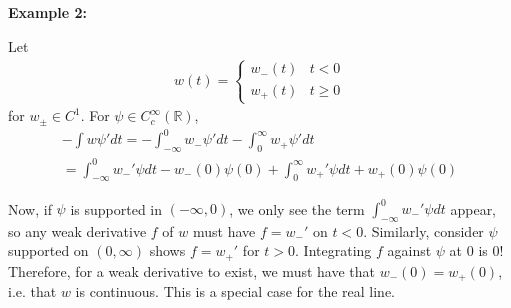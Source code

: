 \documentclass{article}
\newcommand{\R}{{\mathbb{R}}}
\newcommand{\CC}{C_{c}^{\infty}}
\begin{document}
	\textbf{Example 2:}
	
	Let 
	\begin{align*}
		w(t) = \begin{cases}
			w_{-}(t) & t<0 \\ w_{+}(t) & t \geq 0
		\end{cases}
	\end{align*}
	for $w_{\pm} \in C^{1}$. For $\psi \in \CC(\R)$,
	\begin{align*}
		-\int w \psi'dt = - \int_{-\infty}^{0} w_{-}\psi' dt - \int_{0}^{\infty} w_{+} \psi'dt \\
		= \int_{-\infty}^{0} w_{-}'\psi dt - w_{-}(0)\psi(0) + \int_{0}^{\infty} w_{+}' \psi dt + w_{+}(0)\psi(0)
	\end{align*}
	
	Now, if $\psi$ is supported in $(-\infty,0)$, we only see the term $\int_{-\infty}^{0} w_{-}'\psi dt$ appear, so any weak derivative $f$ of $w$ must have $f = w_{-}'$ on $t<0$. Similarly, consider $\psi$ supported on $(0,\infty)$ shows $f = w_{+}'$ for $t>0$. Integrating $f$ against $\psi$ at $0$ is 0! Therefore, for a weak derivative to exist, we must have that $w_{-}(0) = w_{+}(0)$, i.e. that $w$ is continuous. This is a special case for the real line. 
	
	\vspace{0.25 cm}
	
\end{document}
